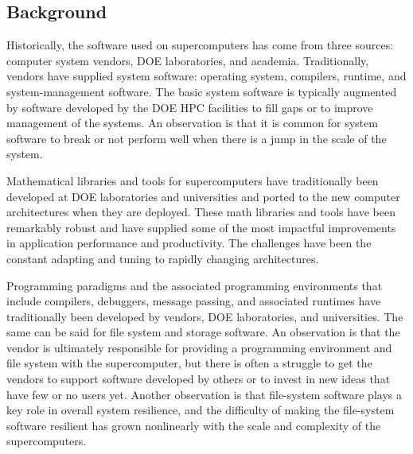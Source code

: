 \subsection{Background}
Historically, the software used on supercomputers has come from three sources: computer system vendors, DOE laboratories, and academia. Traditionally, vendors have supplied system software:  operating system, compilers, runtime, and system-management software. The basic system software is typically augmented by software developed by the DOE HPC facilities to fill gaps or to improve management of the systems. An observation is that it is common for system software to break or not perform well when there is a jump in the scale of the system.
 
Mathematical libraries and tools for supercomputers have traditionally been developed at DOE laboratories and universities and ported to the new computer architectures when they are deployed. These math libraries and tools have been remarkably robust and have supplied some of the most impactful improvements in application performance and productivity. The challenges have been the constant adapting and tuning to rapidly changing architectures.
 
Programming paradigms and the associated programming environments that include compilers, debuggers, message passing, and associated runtimes have traditionally been developed by vendors, DOE laboratories, and universities. The same can be said for file system and storage software. An observation is that the vendor is ultimately responsible for providing a programming environment and file system with the supercomputer, but there is often a struggle to get the vendors to support software developed by others or to invest in new ideas that have few or no users yet. Another observation is that file-system software plays a key role in overall system resilience, and the difficulty of making the file-system software resilient has grown nonlinearly with the scale and complexity of the supercomputers.
 
